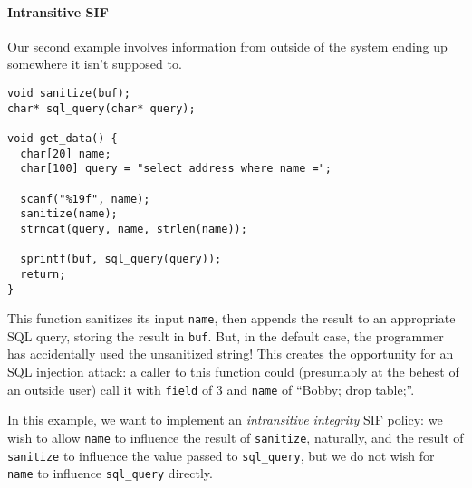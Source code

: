 \documentclass{llncs}
\begin{document}

                         
  

\paragraph*{Intransitive SIF}

Our second example involves information from outside of the system ending up somewhere it isn't supposed to.

\begin{verbatim}
void sanitize(buf);
char* sql_query(char* query);

void get_data() {
  char[20] name;
  char[100] query = "select address where name =";

  scanf("%19f", name);
  sanitize(name);
  strncat(query, name, strlen(name));
  
  sprintf(buf, sql_query(query));
  return;
}
\end{verbatim}

This function sanitizes its input {\tt name}, then appends the result to an appropriate SQL
query, storing the result in {\tt buf}. But, in the default case, the programmer has accidentally
used the unsanitized string! This creates the opportunity for an SQL injection attack: a caller
to this function could (presumably at the behest of an outside user) call it with {\tt field} of
3 and {\tt name} of ``Bobby; drop table;''.

In this example, we want to implement an {\it intransitive integrity} SIF policy:
we wish to allow {\tt name} to influence the result of {\tt sanitize}, naturally, and the result
of {\tt sanitize} to influence the value passed to {\tt sql\_query}, but we do not wish for
{\tt name} to influence {\tt sql\_query} directly.
\end{document}
